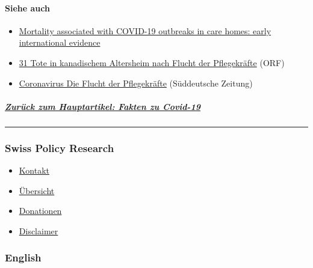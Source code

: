 \hypertarget{siehe-auch}{%
\paragraph{Siehe auch}\label{siehe-auch}}

\begin{itemize}
\tightlist
\item
  \href{https://ltccovid.org/2020/04/12/mortality-associated-with-covid-19-outbreaks-in-care-homes-early-international-evidence/}{Mortality
  associated with COVID-19 outbreaks in care homes: early international
  evidence}
\item
  \href{https://orf.at/stories/3162365/}{31 Tote in kanadischem
  Altersheim nach Flucht der Pflegekräfte} (ORF)
\item
  \href{https://www.sueddeutsche.de/politik/coronavirus-pflegekraefte-ausland-1.4866124}{Coronavirus
  Die Flucht der Pflegekräfte} (Süddeutsche Zeitung)
\end{itemize}

\hypertarget{zuruxfcck-zum-hauptartikel-fakten-zu-covid-19}{%
\subparagraph{\texorpdfstring{\href{https://swprs.org/covid-19-hinweis-ii/}{Zurück
zum Hauptartikel: Fakten zu
Covid-19}}{Zurück zum Hauptartikel: Fakten zu Covid-19}}\label{zuruxfcck-zum-hauptartikel-fakten-zu-covid-19}}

\begin{center}\rule{0.5\linewidth}{\linethickness}\end{center}

\hypertarget{swiss-policy-research}{%
\subsubsection{Swiss Policy Research}\label{swiss-policy-research}}

\begin{itemize}
\tightlist
\item
  \href{https://swprs.org/kontakt/}{Kontakt}
\item
  \href{https://swprs.org/uebersicht/}{Übersicht}
\item
  \href{https://swprs.org/donationen/}{Donationen}
\item
  \href{https://swprs.org/disclaimer/}{Disclaimer}
\end{itemize}

\hypertarget{english}{%
\subsubsection{English}\label{english}}

